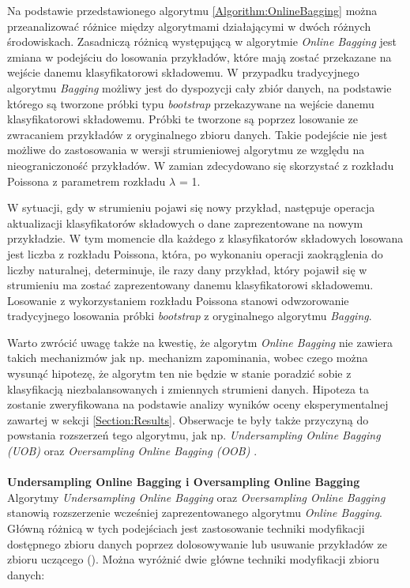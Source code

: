 \noindent Na podstawie przedstawionego algorytmu \ref{Algorithm:OnlineBagging} można przeanalizować różnice między algorytmami działającymi w dwóch różnych środowiskach. Zasadniczą różnicą występującą w algorytmie \textit{Online Bagging} jest zmiana w podejściu do losowania przykładów, które mają zostać przekazane na wejście danemu klasyfikatorowi składowemu. W przypadku tradycyjnego algorytmu \textit{Bagging} możliwy jest do dyspozycji cały zbiór danych, na podstawie którego są tworzone próbki typu \textit{bootstrap} przekazywane na wejście danemu klasyfikatorowi składowemu. Próbki te tworzone są poprzez losowanie ze zwracaniem przykładów z oryginalnego zbioru danych. Takie podejście nie jest możliwe do zastosowania w wersji strumieniowej algorytmu ze względu na nieograniczoność przykładów. W zamian zdecydowano się skorzystać z rozkładu Poissona z parametrem rozkładu $\lambda$ = 1. 

W sytuacji, gdy w strumieniu pojawi się nowy przykład, następuje operacja aktualizacji klasyfikatorów składowych o dane zaprezentowane na nowym przykładzie. W tym momencie dla każdego z klasyfikatorów składowych losowana jest liczba z rozkładu Poissona, która, po wykonaniu operacji zaokrąglenia do liczby naturalnej, determinuje, ile razy dany przykład, który pojawił się w strumieniu ma zostać zaprezentowany danemu klasyfikatorowi składowemu. Losowanie z wykorzystaniem rozkładu Poissona stanowi odwzorowanie tradycyjnego losowania próbki \textit{bootstrap} z oryginalnego algorytmu \textit{Bagging}.

Warto zwrócić uwagę także na kwestię, że algorytm \textit{Online Bagging} nie zawiera takich mechanizmów jak np. mechanizm zapominania, wobec czego można wysunąć hipotezę, że algorytm ten nie będzie w stanie poradzić sobie z klasyfikacją niezbalansowanych i zmiennych strumieni danych. Hipoteza ta zostanie zweryfikowana na podstawie analizy wyników oceny eksperymentalnej zawartej w sekcji \ref{Section:Results}. Obserwacje te były także przyczyną do powstania rozszerzeń tego algorytmu, jak np. \textit{Undersampling Online Bagging (UOB)} oraz \textit{Oversampling Online Bagging (OOB)} \cite{Article:OBFirst}\cite{Article:OBSecond}.\\\\
\textbf{Undersampling Online Bagging i Oversampling Online Bagging}\\

\noindent Algorytmy \textit{Undersampling Online Bagging} oraz \textit{Oversampling Online Bagging} stanowią rozszerzenie wcześniej zaprezentowanego algorytmu \textit{Online Bagging}. Główną różnicą w tych podejściach jest zastosowanie techniki modyfikacji dostępnego zbioru danych poprzez dolosowywanie lub usuwanie przykładów ze zbioru uczącego (). Można wyróżnić dwie główne techniki modyfikacji zbioru danych:


